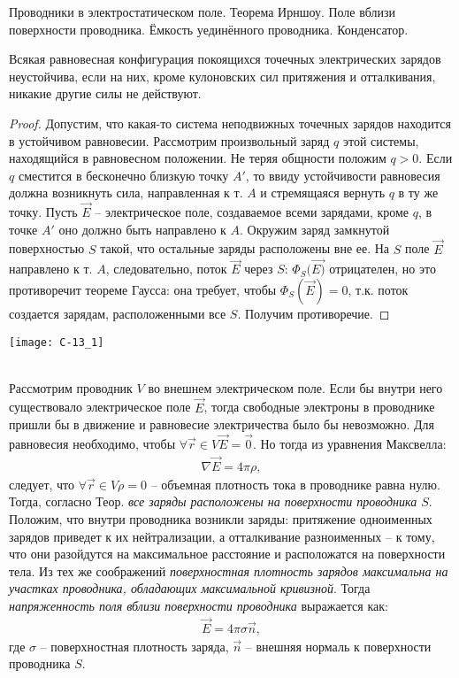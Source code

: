 \documentclass[__main__.tex]{subfiles}
\begin{document}
Проводники в электростатическом поле. Теорема Ирншоу. Поле вблизи поверхности проводника. Ёмкость уединённого проводника. Конденсатор.\\

\begin{theorem}
    Всякая равновесная конфигурация покоящихся точечных электрических зарядов неустойчива, если на них, кроме кулоновских сил притяжения и отталкивания, никакие другие силы не действуют.
\end{theorem}
\begin{minipage}{.65\linewidth}
    \begin{proof}
        Допустим, что какая-то система неподвижных точечных зарядов находится в устойчивом равновесии. Рассмотрим произвольный заряд $q$ этой системы, находящийся в равновесном положении. Не теряя общности положим $q>0$. Если $q$ сместится в бесконечно близкую точку $A'$, то ввиду устойчивости равновесия должна возникнуть сила, направленная к т. $A$ и стремящаяся вернуть $q$ в ту же точку. Пусть $\vec{E}$ -- электрическое поле, создаваемое всеми зарядами, кроме $q$, в точке $A'$ оно должно быть направлено к $A$. Окружим заряд замкнутой поверхностью $S$ такой, что остальные заряды расположены вне ее. На $S$ поле $\vec{E}$ направлено к т. $A$, следовательно, поток $\vec{E}$ через $S$: $\Phi_{S}(\vec{E)}$ отрицателен, но это противоречит теореме Гаусса: она требует, чтобы $\Phi_{S}(\vec{E})=0$, т.к. поток создается зарядам, расположенными все $S$. Получим противоречие.
    \end{proof}
\end{minipage}
\hfill
\begin{minipage}{.25\linewidth}
    \texttt{[image: С-13\_1]}
\end{minipage}\\

Рассмотрим проводник $V$ во внешнем электрическом поле. Если бы внутри него существовало электрическое поле $\vec{E}$, тогда свободные электроны в проводнике пришли бы в движение и равновесие электричества было бы невозможно. Для равновесия необходимо, чтобы $\forall\vec{r}\in{V}\vec{E}=\vec{0}$. Но тогда из уравнения Максвелла:
\begin{gather}
    \nabla\vec{E}=4\pi\rho,
\end{gather}
следует, что $\forall\vec{r}\in{V}\rho=0$ -- объемная плотность тока в проводнике равна нулю. Тогда, согласно Теор.  \emph{все заряды расположены на поверхности проводника $S$}. Положим, что внутри проводника возникли заряды: притяжение одноименных зарядов приведет к их нейтрализации, а отталкивание разноименных -- к тому, что они разойдутся на максимальное расстояние и расположатся на поверхности тела. Из тех же соображений \emph{поверхностная плотность зарядов максимальна на участках проводника, обладающих максимальной кривизной}.
Тогда \emph{напряженность поля вблизи поверхности проводника} выражается как:
\begin{gather}
    \vec{E}=4\pi\sigma\vec{n},
\end{gather}
где $\sigma$ -- поверхностная плотность заряда, $\vec{n}$ -- внешняя нормаль к поверхности проводника $S$.
\end{document}
